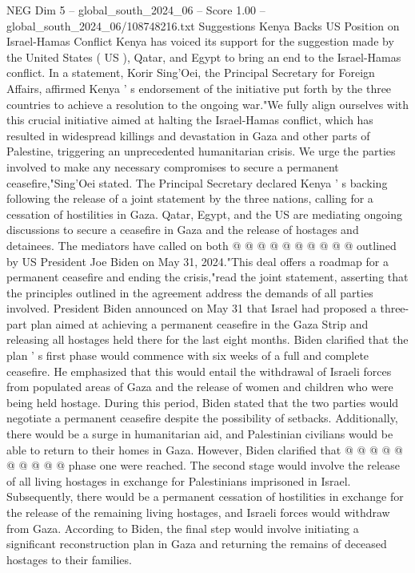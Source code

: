 \begin{textsample}{NEG Dim 5 – global\_south\_2024\_06 – Score 1.00 – global\_south\_2024\_06/108748216.txt}  \label{ex:f5_neg_227}
Suggestions Kenya Backs US Position on Israel-Hamas Conflict Kenya has voiced its support for the suggestion made by the United States ( US ), Qatar, and Egypt to bring an end to the Israel-Hamas conflict.
In a statement, Korir Sing'Oei, the Principal Secretary for Foreign Affairs, affirmed Kenya ' s endorsement of the initiative put forth by the three countries to achieve a resolution to the ongoing war."We fully align ourselves with this crucial initiative aimed at halting the Israel-Hamas conflict, which has resulted in widespread killings and devastation in Gaza and other parts of Palestine, triggering an unprecedented humanitarian crisis.
We urge the parties involved to make any necessary compromises to secure a permanent ceasefire,"Sing'Oei stated.
The Principal Secretary declared Kenya ' s backing following the release of a joint statement by the three nations, calling for a cessation of hostilities in Gaza.
Qatar, Egypt, and the US are mediating ongoing discussions to secure a ceasefire in Gaza and the release of hostages and detainees.
The mediators have called on both @ @ @ @ @ @ @ @ @ @ outlined by US President Joe Biden on May 31, 2024."This deal offers a roadmap for a permanent ceasefire and ending the crisis,"read the joint statement, asserting that the principles outlined in the agreement address the demands of all parties involved.
President Biden announced on May 31 that Israel had proposed a three-part plan aimed at achieving a permanent ceasefire in the Gaza Strip and releasing all hostages held there for the last eight months.
Biden clarified that the plan ' s first phase would commence with six weeks of a full and complete ceasefire.
He emphasized that this would entail the withdrawal of Israeli forces from populated areas of Gaza and the release of women and children who were being held hostage.
During this period, Biden stated that the two parties would negotiate a permanent ceasefire despite the possibility of setbacks.
Additionally, there would be a surge in humanitarian aid, and Palestinian civilians would be able to return to their homes in Gaza.
However, Biden clarified that @ @ @ @ @ @ @ @ @ @ phase one were reached.
The second stage would involve the release of all living hostages in exchange for Palestinians imprisoned in Israel.
Subsequently, there would be a permanent cessation of hostilities in exchange for the release of the remaining living hostages, and Israeli forces would withdraw from Gaza.
According to Biden, the final step would involve initiating a significant reconstruction plan in Gaza and returning the remains of deceased hostages to their families.

\end{textsample}

